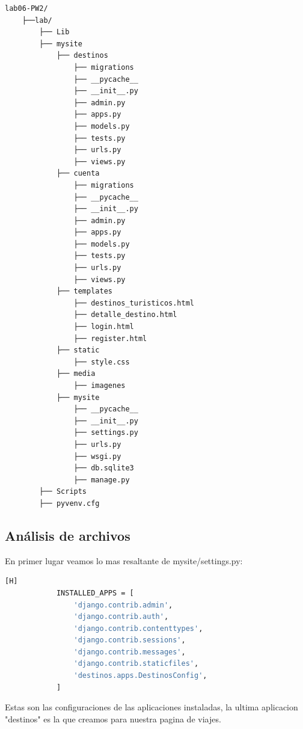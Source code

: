 \documentclass{article}
\begin{document}
\begin{lstlisting}[style=ascii-tree]
lab06-PW2/
    ├──lab/
        ├── Lib
        ├── mysite
            ├── destinos
                ├── migrations
                ├── __pycache__
                ├── __init__.py
                ├── admin.py
                ├── apps.py
                ├── models.py
                ├── tests.py
                ├── urls.py
                ├── views.py
            ├── cuenta
                ├── migrations
                ├── __pycache__
                ├── __init__.py
                ├── admin.py
                ├── apps.py
                ├── models.py
                ├── tests.py
                ├── urls.py
                ├── views.py
            ├── templates
                ├── destinos_turisticos.html
                ├── detalle_destino.html
                ├── login.html
                ├── register.html
            ├── static
                ├── style.css
            ├── media
                ├── imagenes
            ├── mysite
                ├── __pycache__
                ├── __init__.py
                ├── settings.py
                ├── urls.py
                ├── wsgi.py
                ├── db.sqlite3
                ├── manage.py
        ├── Scripts
        ├── pyvenv.cfg

\end{lstlisting}  
 
	\subsection{Análisis de archivos }
		\item En primer lugar veamos lo mas resaltante de mysite/settings.py:\newline\newline
        
	\begin{lstlisting}[language=bash,caption={Analizando mysite/settings.py}][H]
            INSTALLED_APPS = [
                'django.contrib.admin',
                'django.contrib.auth',
                'django.contrib.contenttypes',
                'django.contrib.sessions',
                'django.contrib.messages',
                'django.contrib.staticfiles',
                'destinos.apps.DestinosConfig',
            ]
	\end{lstlisting}
        Estas son las configuraciones de las aplicaciones instaladas, la ultima aplicacion "destinos" es la que creamos para nuestra pagina de viajes.
                  
\end{document}
